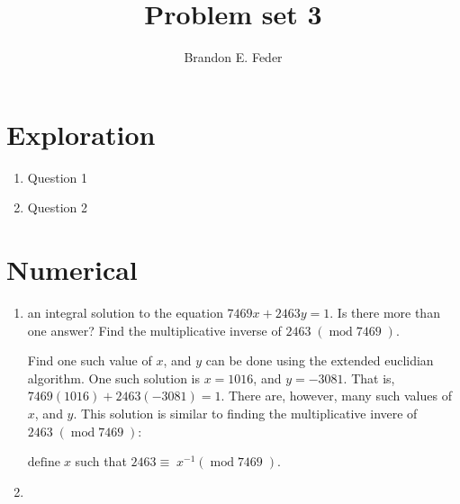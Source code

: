 \documentclass[12pt]{article}
\title{Problem set 3}
\date{}
\author{Brandon E. Feder}
\begin{document}
    \maketitle
    
    \section*{Exploration}
    \begin{enumerate}
        \item Question 1
        \item Question 2
    \end{enumerate}

    \section*{Numerical}

    \begin{enumerate}[resume]
        \item \Find an integral solution to the equation $7469x+2463y=1$. Is there more than one answer? Find the multiplicative inverse of $2463\;(\;\text{mod}\;7469\;)$.
        
        Find one such value of $x$, and $y$ can be done using the extended euclidian algorithm. One such solution is $x=1016$, and $y=-3081$. That is, $7469(1016)+2463(-3081)=1$. There are, however, many such values of $x$, and $y$. This solution is similar to finding the multiplicative invere of $2463\;(\;\mathrm{mod}\;7469\;)$:

        
        $\mathrm{define}\;x$ such that $2463\equiv \;x^{-1}(\;\mathrm{mod}\;7469\;)$.

        
        
        
        
        \item 

    \end{enumerate}

    
\end{document}

